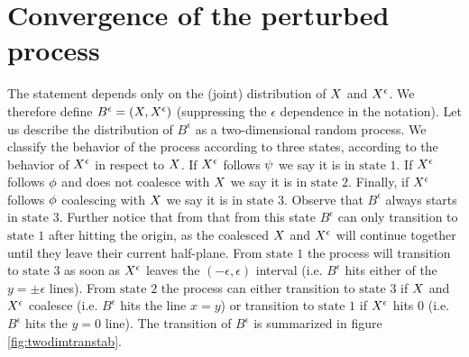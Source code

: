 {
\newpage

\section{Convergence of the perturbed process}
\label{sec:proof-of-lem:resamplede-to-sampled}

\newcommand{\bandwidth}{\delta}
\newcommand{\rotproc}{Y}

\newcommand{\union}{\cup}
\renewcommand{\L}{L^+ \union L^-}
\newcommand{\Le}{L^\epsilon}
\newcommand{\statenoweb}{\text{state }1}
\newcommand{\statewebapart}{\text{state }2}
\newcommand{\statewebtogether}{\text{state }3}
\newcommand{\twodim}{B^\epsilon}

The statement
\statementoflemresampledetosampled{} depends only on the
(joint) distribution of $X$ and $X^{\epsilon}$. We therefore define $\twodim=(\sampled, \resamplede)$ (suppressing the $\epsilon$ dependence in the notation). Let us describe the distribution of $\twodim$
 as a two-dimensional random process.
We classify the behavior of the process according to three states, according to
the behavior of $X^{\epsilon}$ in respect to $X$. If $X^{\epsilon}$ follows
$\psi$ we say it is in $\statenoweb$. If $X^{\epsilon}$ follows $\phi$
and does not coalesce with $X$ we say it is in $\statewebapart$. Finally,
if $X^{\epsilon}$ follows $\phi$ coalescing with $X$ we say it is in
$\statewebtogether$.  Observe that $\twodim$ always starts
in $\statewebtogether$. Further notice that from that from this state $\twodim$
can only transition to $\statenoweb$ after hitting the origin, as the coalesced
$X$ and $X^{\epsilon}$ will continue together until they leave their
current half-plane. From $\statenoweb$ the process will transition to
$\statewebtogether$ as soon as $X^{\epsilon}$ leaves the $(-\epsilon,\epsilon)$
interval (i.e. $\twodim$ hits either of the $y=\pm\epsilon$ lines). From
$\statewebapart$ the process can either transition to $\statewebtogether$
if $X$ and $X^{\epsilon}$ coalesce (i.e. $\twodim$ hits the line $x=y$)
or transition to $\statenoweb$ if $X^{\epsilon}$ hits $0$ (i.e. $\twodim$ hits
the $y=0$ line). The transition of $\twodim$ is summarized in figure
\ref{fig:twodimtranstab}.

}
